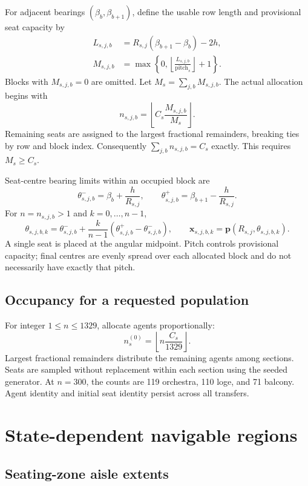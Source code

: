 \documentclass[11pt]{article}
\begin{document}
For adjacent bearings $(\beta_b,\beta_{b+1})$, define the usable row length
and provisional seat capacity by
\begin{align}
 L_{s,j,b}&=R_{s,j}(\beta_{b+1}-\beta_b)-2h,\\
 M_{s,j,b}&=\max\!\left\{0,
             \left\lfloor\frac{L_{s,j,b}}{\text{pitch}_s}\right\rfloor+1\right\}.
\end{align}
Blocks with $M_{s,j,b}=0$ are omitted. Let
$M_s=\sum_{j,b}M_{s,j,b}$. The actual allocation begins with
\[
 n_{s,j,b}=\left\lfloor C_s\frac{M_{s,j,b}}{M_s}\right\rfloor.
\]
Remaining seats are assigned to the largest fractional remainders, breaking
ties by row and block index. Consequently $\sum_{j,b}n_{s,j,b}=C_s$ exactly.
This requires $M_s\geq C_s$.

Seat-centre bearing limits within an occupied block are
\[
 \theta^-_{s,j,b}=\beta_b+\frac{h}{R_{s,j}},\qquad
 \theta^+_{s,j,b}=\beta_{b+1}-\frac{h}{R_{s,j}}.
\]
For $n=n_{s,j,b}>1$ and $k=0,\ldots,n-1$,
\[
 \theta_{s,j,b,k}=\theta^-_{s,j,b}
     +\frac{k}{n-1}(\theta^+_{s,j,b}-\theta^-_{s,j,b}),\qquad
 \mathbf x_{s,j,b,k}=\mathbf p(R_{s,j},\theta_{s,j,b,k}).
\]
A single seat is placed at the angular midpoint. Pitch controls provisional
capacity; final centres are evenly spread over each allocated block and do
not necessarily have exactly that pitch.

\subsection{Occupancy for a requested population}

For integer $1\leq n\leq1329$, allocate agents proportionally:
\[
 n_s^{(0)}=\left\lfloor n\frac{C_s}{1329}\right\rfloor.
\]
Largest fractional remainders distribute the remaining agents among sections.
Seats are sampled without replacement within each section using the seeded
generator. At $n=300$, the counts are 119 orchestra, 110 loge, and 71 balcony.
Agent identity and initial seat identity persist across all transfers.

\section{State-dependent navigable regions}

\subsection{Seating-zone aisle extents}
\end{document}
